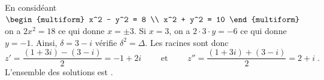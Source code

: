 \begin{corrige}
\begin{sol}
\begin{itemize}
      En consid\'eant
      $\displaystyle{
	      \begin{multiform}
		      x^2 - y^2 = 8       \\
		      x^2 + y^2 = 10      
	      \end{multiform}
      }$
      on a $ 2 x^2 = 18 $ ce qui donne $x = \pm 3$.
      Si $x = 3$, on a $2 \cdot 3 \cdot y = -6$ ce qui donne $y = -1$.
      Ainsi, $\delta = 3 - i$ v\'erifie $\delta^2 = \Delta$.
      Les racines sont donc 
      \[
      z' = \frac{(1+3i) - (3-i)}{2} = -1 + 2i
      \qquad
      \text{ et }
      \qquad
      z'' = \frac{(1+3i) + (3-i)}{2} = 2 + i
      \; .
      \]
      L'ensemble des solutions est 
      .
\end{itemize}
\end{sol}


\end{corrige}
